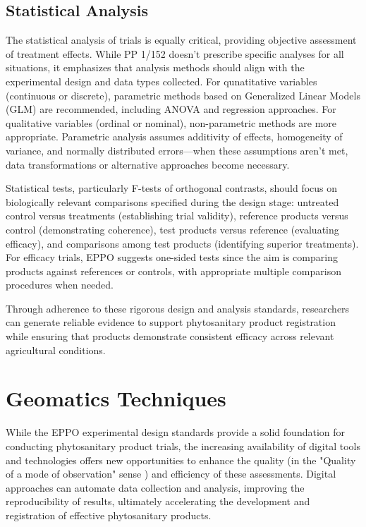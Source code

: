 \documentclass[12pt,a4paper,oneside]{report}
\begin{document}
\subsection{Statistical Analysis}

The statistical analysis of trials is equally critical, providing objective 
assessment of treatment effects. While PP 1/152 \cite{EPPO_PP1_152} doesn't prescribe 
specific analyses for all situations, it emphasizes that analysis methods should 
align with the experimental design and data types collected. For qunatitative 
variables (continuous or discrete), parametric methods based on Generalized 
Linear Models (GLM) are recommended, including ANOVA and regression approaches. 
For qualitative variables (ordinal or nominal), non-parametric methods are more 
appropriate. Parametric analysis assumes additivity of effects, homogeneity of variance, 
and normally distributed errors—when these assumptions aren't met, data transformations 
or alternative approaches become necessary.

Statistical tests, particularly F-tests of orthogonal 
contrasts, should focus on biologically relevant comparisons specified during the 
design stage: untreated control versus treatments (establishing trial validity), 
reference products versus control (demonstrating coherence), test products versus 
reference (evaluating efficacy), and comparisons among test products (identifying 
superior treatments). For efficacy trials, EPPO suggests one-sided tests since the 
aim is comparing products against references or controls, with appropriate multiple 
comparison procedures when needed.

Through adherence to these rigorous design and analysis standards, researchers can 
generate reliable evidence to support phytosanitary product registration while ensuring 
that products demonstrate consistent efficacy across relevant agricultural conditions.

\section{Geomatics Techniques}

While the EPPO experimental design standards provide a solid foundation for conducting
phytosanitary product trials, the increasing availability of digital tools and technologies
offers new opportunities to enhance the quality (in the "Quality of a mode of observation" sense \cite{EPPO_PP1_152}) 
and efficiency of these assessments.
Digital approaches can automate data collection and analysis, improving the
reproducibility of results, ultimately accelerating the development and registration of
effective phytosanitary products.
\end{document}
